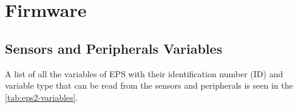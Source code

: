 %
%
%
%
%

%
%
%
%
%
%

\chapter{Firmware} \label{ch:firmware}

\section{Sensors and Peripherals Variables}

A list of all the variables of EPS with their identification number (ID) and variable type that can be read from the sensors and peripherals is seen in the \autoref{tab:eps2-variables}.


